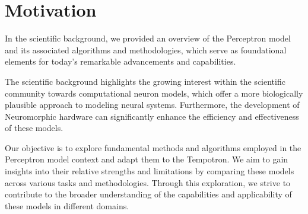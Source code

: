 \chapter{Motivation}
\label{chap:motivation}

In the scientific background, we provided an overview of the Perceptron model and its associated algorithms and methodologies, which serve as foundational elements for today's remarkable advancements and capabilities. 

The scientific background highlights the growing interest within the scientific community towards computational neuron models, which offer a more biologically plausible approach to modeling neural systems. Furthermore, the development of Neuromorphic hardware can significantly enhance the efficiency and effectiveness of these models.

Our objective is to explore fundamental methods and algorithms employed in the Perceptron model context and adapt them to the Tempotron. We aim to gain insights into their relative strengths and limitations by comparing these models across various tasks and methodologies. Through this exploration, we strive to contribute to the broader understanding of the capabilities and applicability of these models in different domains.

